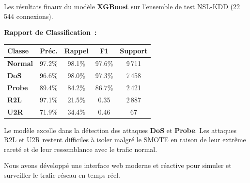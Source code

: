 \documentclass{article}
\newlength{\colW}  \setlength{\colW}{180mm}
\newcommand{\bodyfont}{\fontsize{16}{22}\selectfont}
\newcommand{\smallfont}{\fontsize{14}{19}\selectfont}
\newcommand{\labelfont}{\fontsize{14}{18}\selectfont\bfseries}
\begin{document}
\begin{minipage}[t]{\colW}

\begin{tcolorbox}[pc, title={\faTrophy\; R\'esultats D\'etaill\'es}]
\bodyfont\color{TextMain}
Les r\'esultats finaux du mod\`ele \textbf{XGBoost} sur l'ensemble de test NSL-KDD (22\,544 connexions).

\vspace{5mm}
{\labelfont\color{Primary}Rapport de Classification~:}
\vspace{2mm}

{\smallfont
\setlength{\tabcolsep}{2.5mm}
\renewcommand{\arraystretch}{1.5}
\begin{tabular}{@{}lcccc@{}}
\toprule
\rowcolor{Primary}%
  \color{white}\textbf{Classe} &
  \color{white}\textbf{Pr\'ec.} &
  \color{white}\textbf{Rappel} &
  \color{white}\textbf{F1} &
  \color{white}\textbf{Support} \\
\midrule
\textcolor{NormalColor}{\textbf{Normal}} & 97.2\% & 98.1\% & 97.6\% & 9\,711 \\
\rowcolor{HighlightBG}%
\textcolor{DosColor}{\textbf{DoS}}       & 96.6\% & 98.0\% & 97.3\% & 7\,458 \\
\textcolor{ProbeColor}{\textbf{Probe}}   & 89.4\% & 84.2\% & 86.7\% & 2\,421 \\
\rowcolor{HighlightBG}%
\textcolor{R2LColor}{\textbf{R2L}}       & 97.1\% & 21.5\% & 0.35  & 2\,887 \\
\textcolor{U2RColor}{\textbf{U2R}}       & 71.9\% & 34.4\% & 0.46  &    67 \\
\bottomrule
\end{tabular}
}

\vspace{5mm}
\bodyfont
Le mod\`ele excelle dans la d\'etection des attaques \textbf{DoS} et \textbf{Probe}. Les attaques R2L et U2R restent difficiles \`a isoler malgr\'e le SMOTE en raison de leur extr\^eme raret\'e et de leur ressemblance avec le trafic normal.
\end{tcolorbox}

\vspace{8mm}

\begin{tcolorbox}[pc, title={\faDesktop\; Dashboard Temps R\'eel}]
\bodyfont\color{TextMain}
Nous avons d\'evelopp\'e une interface web moderne et r\'eactive pour simuler et surveiller le trafic r\'eseau en temps r\'eel.

\vspace{4mm}


\end{tcolorbox}
\end{minipage}
\end{document}
